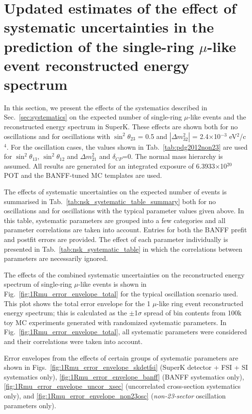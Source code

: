 \clearpage

\section {Updated estimates of the effect of systematic uncertainties in the prediction of the single-ring $\mu$-like event reconstructed energy spectrum}
\label{sec:spectrum_uncertainties}

In this section, we present the effects of the systematics described in Sec.\ \ref{sec:systematics}
on the expected number of single-ring $\mu$-like events and the reconstructed energy spectrum in SuperK.
These effects are shown both for no oscillations and for oscillations with
$\sin^{2}\theta_{23}$ = 0.5 and $|\Delta m^{2}_{32}|$ = 2.4$\times$10$^{-3}$ eV$^{2}$/c$^{4}$.
For the oscillation cases, the values shown in Tab.\
\ref{tab:pdg2012non23} are used for $\sin^{2}\theta_{13}$, $\sin^{2}\theta_{12}$ and $\Delta m^{2}_{21}$ 
and $\delta_{CP}$=0. The normal mass hierarchy is assumed.
All results are generated for an integrated exposure of 6.3933$\times$10$^{20}$ POT and
the BANFF-tuned MC templates are used.

The effects of systematic uncertainties on the expected number of events is summarised in Tab.\ \ref{tab:nsk_systematic_table_summary} 
both for no oscillations and for oscillations with the typical parameter values given above.
In this table, systematic parameters are grouped into a few categories and all parameter correlations are taken into account.
Entries for both the BANFF prefit and postfit errors are provided.
The effect of each parameter individually is presented in Tab.\ \ref{tab:nsk_systematic_table} in which the correlations
between parameters are necessarily ignored.

The effects of the combined systematic uncertainties on the reconstructed energy spectrum of single-ring $\mu$-like events
is shown in Fig.\ \ref{fig:1Rmu_error_envelope_total} for the typical oscillation scenario used.
This plot shows the total error envelope for the 1 $\mu$-like ring event reconstructed energy spectrum; this is calculated
as the $\pm$1$\sigma$ spread of bin contents from 100k toy MC experiments generated with randomized systematic parameters.
In Fig.\ \ref{fig:1Rmu_error_envelope_total}, all systematic parameters were considered and their correlations were taken
into account.

Error envelopes from the effects of certain groups of systematic parameters are shown in
Figs.\ \ref{fig:1Rmu_error_envelope_skdetfsi} (SuperK detector + FSI + SI systematics only),
\ref{fig:1Rmu_error_envelope_banff} (BANFF systematics only),
\ref{fig:1Rmu_error_envelope_uncor_xsec} (uncorrelated cross-section systematics only), and
\ref{fig:1Rmu_error_envelope_non23osc} (\emph{non-23-sector} oscillation parameters only).


